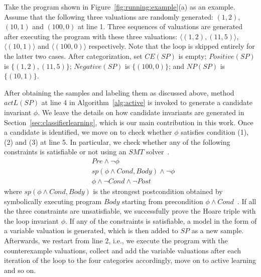 \begin{example} \label{example2}
Take the program shown in Figure~\ref{fig:running:example}(a) as an example. Assume that the following three valuations are randomly generated:
$(1, 2)$, $(10, 1)$ and $(100, 0)$ at line 1. Three sequences of valuations are generated after executing the program with these three valuations: $\langle (1, 2), (11, 5) \rangle$, $\langle (10, 1) \rangle$ and $\langle (100, 0) \rangle$ respectively.
Note that the loop is skipped entirely for the latter two cases. After categorization, set $CE(SP)$ is empty; $Positive(SP)$ is $\{(1, 2),(11, 5)\}$; $Negative(SP)$ is $\{(100, 0)\}$; and $NP(SP)$ is $\{(10, 1)\}$.
\end{example}
After obtaining the samples and labeling them as discussed above, method $actL(SP)$ at line 4 in Algorithm~\ref{alg:active} is invoked to generate a candidate invariant $\phi$. We leave the details on how candidate invariants are generated in Section~\ref{sec:classifierlearning}, which is our main contribution in this work. Once a candidate is identified, we move on to check whether $\phi$ satisfies condition (1), (2) and (3) at line 5. In particular, we check whether any of the following constraints is satisfiable or not using an $SMT$ solver~\cite{barrett2009satisfiability,de2008z3}.
\begin{align}
    & \mathit{Pre} \land \neg \phi \label{check:inv:pre} \\
     & sp(\phi \land Cond, Body) \land \neg \phi \label{check:inv:loop} \\
    & \phi \land \neg Cond \land \neg Post \label{check:inv:post}
\end{align}
where $sp(\phi \land Cond,Body)$ is the strongest postcondition obtained by symbolically executing program $Body$ starting from precondition $\phi \land Cond$~\cite{DBLP:journals/cacm/Dijkstra75}. If all the three constraints are unsatisfiable, we successfully prove the Hoare triple with the loop invariant $\phi$. If any of the constraints is satisfiable, a model in the form of a variable valuation is generated, which is then added to $SP$ as a new sample. Afterwards, we restart from line 2, i.e., we execute the program with the counterexample valuations, collect and add the variable valuations after each iteration of the loop to the four categories accordingly, move on to active learning and so on.
